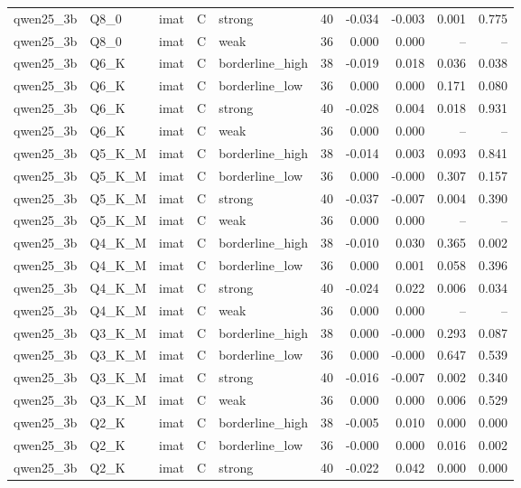 \begin{tabular}{lllllrrrrr}
qwen25\_3b & Q8\_0 & imat & C & strong & 40 & -0.034 & -0.003 & 0.001 & 0.775 \\
qwen25\_3b & Q8\_0 & imat & C & weak & 36 & 0.000 & 0.000 & -- & -- \\
qwen25\_3b & Q6\_K & imat & C & borderline\_high & 38 & -0.019 & 0.018 & 0.036 & 0.038 \\
qwen25\_3b & Q6\_K & imat & C & borderline\_low & 36 & 0.000 & 0.000 & 0.171 & 0.080 \\
qwen25\_3b & Q6\_K & imat & C & strong & 40 & -0.028 & 0.004 & 0.018 & 0.931 \\
qwen25\_3b & Q6\_K & imat & C & weak & 36 & 0.000 & 0.000 & -- & -- \\
qwen25\_3b & Q5\_K\_M & imat & C & borderline\_high & 38 & -0.014 & 0.003 & 0.093 & 0.841 \\
qwen25\_3b & Q5\_K\_M & imat & C & borderline\_low & 36 & 0.000 & -0.000 & 0.307 & 0.157 \\
qwen25\_3b & Q5\_K\_M & imat & C & strong & 40 & -0.037 & -0.007 & 0.004 & 0.390 \\
qwen25\_3b & Q5\_K\_M & imat & C & weak & 36 & 0.000 & 0.000 & -- & -- \\
qwen25\_3b & Q4\_K\_M & imat & C & borderline\_high & 38 & -0.010 & 0.030 & 0.365 & 0.002 \\
qwen25\_3b & Q4\_K\_M & imat & C & borderline\_low & 36 & 0.000 & 0.001 & 0.058 & 0.396 \\
qwen25\_3b & Q4\_K\_M & imat & C & strong & 40 & -0.024 & 0.022 & 0.006 & 0.034 \\
qwen25\_3b & Q4\_K\_M & imat & C & weak & 36 & 0.000 & 0.000 & -- & -- \\
qwen25\_3b & Q3\_K\_M & imat & C & borderline\_high & 38 & 0.000 & -0.000 & 0.293 & 0.087 \\
qwen25\_3b & Q3\_K\_M & imat & C & borderline\_low & 36 & 0.000 & -0.000 & 0.647 & 0.539 \\
qwen25\_3b & Q3\_K\_M & imat & C & strong & 40 & -0.016 & -0.007 & 0.002 & 0.340 \\
qwen25\_3b & Q3\_K\_M & imat & C & weak & 36 & 0.000 & 0.000 & 0.006 & 0.529 \\
qwen25\_3b & Q2\_K & imat & C & borderline\_high & 38 & -0.005 & 0.010 & 0.000 & 0.000 \\
qwen25\_3b & Q2\_K & imat & C & borderline\_low & 36 & -0.000 & 0.000 & 0.016 & 0.002 \\
qwen25\_3b & Q2\_K & imat & C & strong & 40 & -0.022 & 0.042 & 0.000 & 0.000 \\

\end{tabular}
